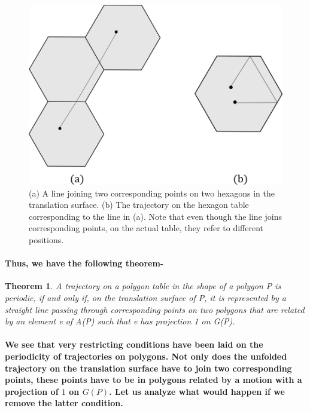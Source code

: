 \documentclass{report}
\newtheorem{theorem}{Theorem}[chapter]
\begin{document}
\begin{figure} 
\begin{center}
\includegraphics[scale=0.3]{Tab1}
\caption{(a) A line joining two corresponding points on two hexagons in the translation surface. (b) The trajectory on the hexagon table corresponding to the line in (a). Note that even though the line joins corresponding points, on the actual table, they refer to different positions.}
\end{center}
\end{figure}


\paragraph{Thus, we have the following theorem-}

\begin{theorem}
A trajectory on a polygon table in the shape of a polygon P is periodic, if and only if, on the translation surface of P, it is represented by a straight line passing through corresponding points on two polygons that are related by an element e of A(P) such that e has projection 1 on G(P).
\end{theorem}

\paragraph{We see that very restricting conditions have been laid on the periodicity of trajectories on polygons. Not only does the unfolded trajectory on the translation surface have to join two corresponding points, these points have to be in polygons related by a motion with a projection of $1$ on $G(P)$. Let us analyze what would happen if we remove the latter condition.}
\end{document}
